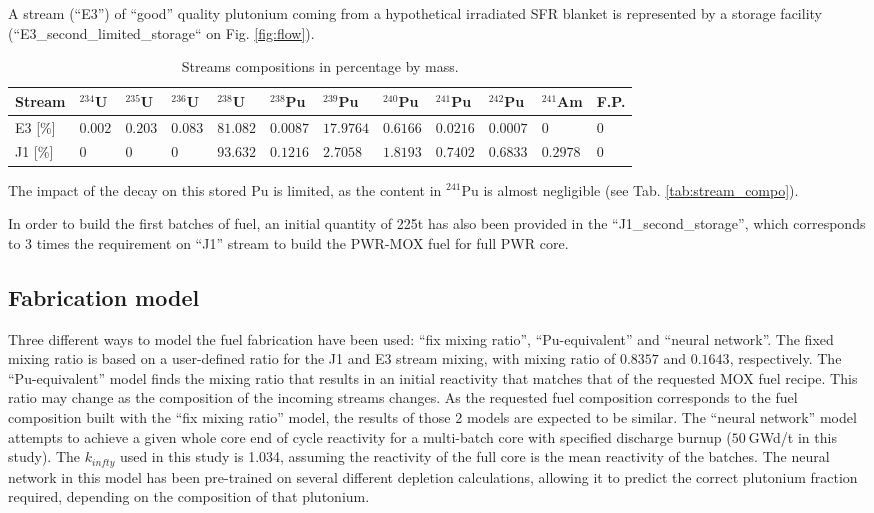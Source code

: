 \documentclass{anstrans}
\begin{document}
A stream (``E3'') of ``good'' quality plutonium coming from a hypothetical irradiated
SFR blanket is represented by a storage facility
(``E3\_second\_limited\_storage`` on Fig. \ref{fig:flow}).

\begin{table}[htb]
  \centering
  \begin{tabular}{llllllllllll}\toprule
    Stream 
    & $^{234}$U   & $^{235}$U   & $^{236}$U   & $^{238}$U   
    & $^{238}$Pu  & $^{239}$Pu  & $^{240}$Pu  & $^{241}$Pu  & $^{242}$Pu 
    & $^{241}$Am  & F.P. \\ \midrule
    E3 [\%]
    & $0.002$   & $0.203$    & $0.083$   & $81.082$
    & $0.0087$  & $17.9764$  & $0.6166$  & $0.0216$  & $0.0007$
    & $0$         & $0$ \\
    J1 [\%]
    & $0$       & $0$        & $0$       & $93.632$
    & $0.1216$  & $2.7058$   & $1.8193$  & $0.7402$  & $0.6833$
    & $0.2978$  & $0$ \\
    \bottomrule
  \end{tabular}
  \caption{Streams compositions in percentage by mass.}
  \label{tab:strem_compo}
\end{table}

The impact of the decay on this stored Pu is limited, as the content in
$^{241}$Pu is almost negligible (see Tab. \ref{tab:stream_compo}).  
 
In order to build the first batches of fuel, an initial quantity of 225t has
also been provided in the ``J1\_second\_storage'', which corresponds to 3 times
the requirement on ``J1'' stream to build the PWR-MOX fuel for full PWR
core. 




\subsection{Fabrication model}
Three different ways to model the fuel fabrication have been used: ``fix mixing
ratio'', ``Pu-equivalent'' and ``neural network''.
The fixed mixing ratio is based on a user-defined ratio for the J1 and E3 stream
mixing, with mixing ratio of $0.8357$ and $0.1643$, respectively.
The ``Pu-equivalent'' model finds the mixing ratio that results in an initial
reactivity that matches that of the requested MOX fuel recipe.  This ratio may
change as the composition of the incoming streams changes.  As the requested
fuel composition corresponds to the fuel composition built with the ``fix mixing
ratio'' model, the results of those 2 models are expected to be similar.  The
``neural network'' model attempts to achieve a given whole core end of cycle 
reactivity for a multi-batch core with specified discharge burnup ($50~$GWd/t in this
study). The $k_{infty}$ used in this study is 1.034, assuming the reactivity of
the full core is the mean reactivity of the batches. The neural network in this
model has been pre-trained on several different depletion calculations, allowing
it to predict the correct plutonium fraction required, depending on the
composition of that plutonium.
\end{document}
